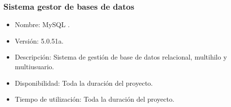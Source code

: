       \subsubsection{Sistema gestor de bases de datos}

         \begin{itemize}
          \item Nombre: MySQL \cite{mysql}.
          \item Versión: 5.0.51a.
          \item Descripción: Sistema de gestión de base de datos relacional,
          multihilo y multiusuario.
          \item Disponibilidad: Toda la duración del proyecto.
          \item Tiempo de utilización: Toda la duración del proyecto.
         \end{itemize}
